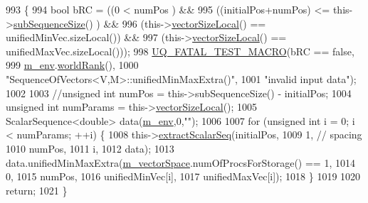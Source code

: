 \begin{DoxyCode}
993 \{
994   \textcolor{keywordtype}{bool} bRC = ((0                       <  numPos                   ) &&
995               ((initialPos+numPos)     <= this->\hyperlink{class_q_u_e_s_o_1_1_sequence_of_vectors_a0224bd3e961d86af5d2886301c0c2b86}{subSequenceSize}()  ) &&
996               (this->\hyperlink{class_q_u_e_s_o_1_1_base_vector_sequence_a2fefedf9e5b90f22881103b3f92555f6}{vectorSizeLocal}() == unifiedMinVec.sizeLocal()) &&
997               (this->\hyperlink{class_q_u_e_s_o_1_1_base_vector_sequence_a2fefedf9e5b90f22881103b3f92555f6}{vectorSizeLocal}() == unifiedMaxVec.sizeLocal()));
998   \hyperlink{_defines_8h_a56d63d18d0a6d45757de47fcc06f574d}{UQ\_FATAL\_TEST\_MACRO}(bRC == \textcolor{keyword}{false},
999                       \hyperlink{class_q_u_e_s_o_1_1_base_vector_sequence_a8e8824d2a63c5a43bcc6473e3a0491e8}{m\_env}.\hyperlink{class_q_u_e_s_o_1_1_base_environment_a78b57112bbd0e6dd0e8afec00b40ffa7}{worldRank}(),
1000                       \textcolor{stringliteral}{"SequenceOfVectors<V,M>::unifiedMinMaxExtra()"},
1001                       \textcolor{stringliteral}{"invalid input data"});
1002 
1003   \textcolor{comment}{//unsigned int numPos = this->subSequenceSize() - initialPos;}
1004   \textcolor{keywordtype}{unsigned} \textcolor{keywordtype}{int} numParams = this->\hyperlink{class_q_u_e_s_o_1_1_base_vector_sequence_a2fefedf9e5b90f22881103b3f92555f6}{vectorSizeLocal}();
1005   ScalarSequence<double> data(\hyperlink{class_q_u_e_s_o_1_1_base_vector_sequence_a8e8824d2a63c5a43bcc6473e3a0491e8}{m\_env},0,\textcolor{stringliteral}{""});
1006 
1007   \textcolor{keywordflow}{for} (\textcolor{keywordtype}{unsigned} \textcolor{keywordtype}{int} i = 0; i < numParams; ++i) \{
1008     this->\hyperlink{class_q_u_e_s_o_1_1_sequence_of_vectors_ac977b3b26a6af2ae727671f1246262fd}{extractScalarSeq}(initialPos,
1009                            1, \textcolor{comment}{// spacing}
1010                            numPos,
1011                            i,
1012                            data);
1013     data.unifiedMinMaxExtra(\hyperlink{class_q_u_e_s_o_1_1_base_vector_sequence_a4bd171e39ed050ff105c808336f35198}{m\_vectorSpace}.numOfProcsForStorage() == 1,
1014                             0,
1015                             numPos,
1016                             unifiedMinVec[i],
1017                             unifiedMaxVec[i]);
1018   \}
1019 
1020   \textcolor{keywordflow}{return};
1021 \}
\end{DoxyCode}

